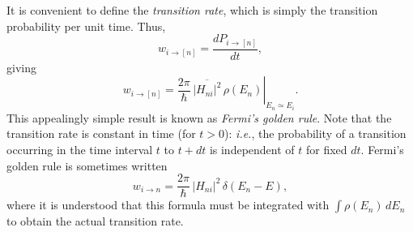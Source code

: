 It is convenient to define the {\em transition rate}, which is simply
the transition probability  per unit time. Thus,
\begin{equation}
w_{i\rightarrow [n]} = \frac{d P_{i\rightarrow [n]}}{dt},
\end{equation}
giving
\begin{equation}\label{e6.222}
w_{i\rightarrow [n]} = \left.\frac{2\pi}{\hbar}\, \overline{|H_{ni}|^2} 
\,\rho(E_n)
\right|_{E_n\simeq E_i}.
\end{equation}
This appealingly simple result is known as {\em Fermi's golden rule}. 
Note that the transition rate is constant in time (for $t>0$):
{\em i.e.}, the probability of a transition occurring in the time interval
$t$ to $t+dt$ is independent of $t$ for fixed $dt$. 
Fermi's golden rule is sometimes written
\begin{equation}\label{e6.222a}
 w_{i\rightarrow n} = \frac{2\pi}{\hbar} \,|H_{ni}|^2\,
\delta(E_n - E),
\end{equation}
where it is understood that this formula must be  integrated 
with $\int \rho(E_n)\, dE_n$ to obtain the actual transition rate. 

